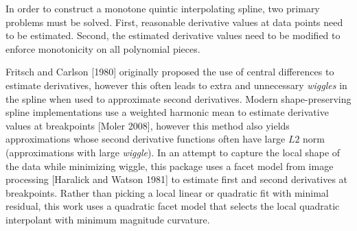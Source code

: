 

In order to construct a monotone quintic interpolating spline, two
primary problems must be solved. First, reasonable derivative values
at data points need to be estimated. Second, the estimated derivative
values need to be modified to enforce monotonicity on all polynomial
pieces.

Fritsch and Carlson [1980] originally proposed the use of central
differences to estimate derivatives, however this often leads to extra
and unnecessary {\it wiggles} in the spline when used to approximate
second derivatives. Modern shape-preserving spline implementations use
a weighted harmonic mean to estimate derivative values at breakpoints
[Moler 2008], however this method also yields approximations whose
second derivative functions often have large $L2$ norm (approximations
with large {\it wiggle}). In an attempt to capture the local shape of
the data while minimizing wiggle, this package uses a facet model from
image processing [Haralick and Watson 1981] to estimate first and
second derivatives at breakpoints. Rather than picking a local linear
or quadratic fit with minimal residual, this work uses a quadratic
facet model that selects the local quadratic interpolant with minimum
magnitude curvature.

